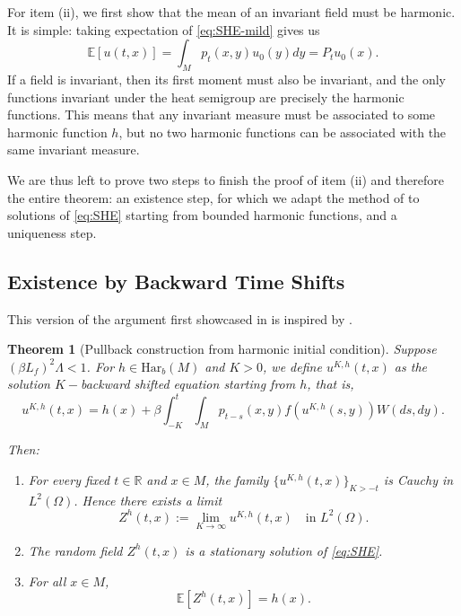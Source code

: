 \documentclass{article}
\newtheorem{theorem}{Theorem}
\numberwithin{theorem}{section}
\def\text{\mbox}
\def\RR{\mathbb{R}} %
\def\EE{\mathbb{E}} %
\begin{document}
For item (ii), we first show that the mean of an invariant field must be harmonic. It is simple: taking expectation of \eqref{eq:SHE-mild} gives us $$\EE[u(t,x)]=\int_{M}p_t(x,y)u_0(y)dy=P_tu_0(x).$$
If a field is invariant, then its first moment must also be invariant, and the only functions invariant under the heat semigroup are precisely the harmonic functions. This means that any invariant measure must be associated to some harmonic function $h$, but no two harmonic functions can be associated with the same invariant measure.

We are thus left to prove two steps to finish the proof of item (ii) and therefore the entire theorem: an existence step, for which we adapt the method of \cite{GL20} to solutions of \eqref{eq:SHE} starting from bounded harmonic functions, and a uniqueness step.


\subsection{Existence by Backward Time Shifts}
\noindent This version of the argument first showcased in \cite{GL20} is inspired by \cite[Theorem 2.10]{GHL25}.

\begin{theorem}[Pullback construction from harmonic initial condition]
\label{thm:pullback_harmonic}
Suppose $(\beta L_f)^2\Lambda<1$.
For $h\in \mathrm{Har}_b(M)$ and $K>0$, we define $u^{K,h}(t,x)$ as the solution $K-$backward shifted equation starting from $h$, that is, \[\label{def:shift PAM}u^{K,h}(t,x)=h(x)+\beta\int_{-K}^t\int_{M}p_{t-s}(x,y)f(u^{K,h}(s,y))W(ds,dy).\]

Then:

\begin{enumerate}[label=(\roman*)]
\item For every fixed $t\in\RR$ and $x\in M$, the family $\{u^{K,h}(t,x)\}_{K>-t}$ is Cauchy in $L^2(\Omega)$. Hence there exists a limit
\[
Z^{h}(t,x)
:= \lim_{K\to\infty} u^{K,h}(t,x)
\quad \text{in } L^2(\Omega).
\]

\item The random field $Z^{h}(t,x)$ 
is a stationary solution of \eqref{eq:SHE}.

\item For all $x\in M$,
\[
\EE[Z^{h}(t,x)] = h(x).
\]
\end{enumerate}
\end{theorem}
\end{document}
